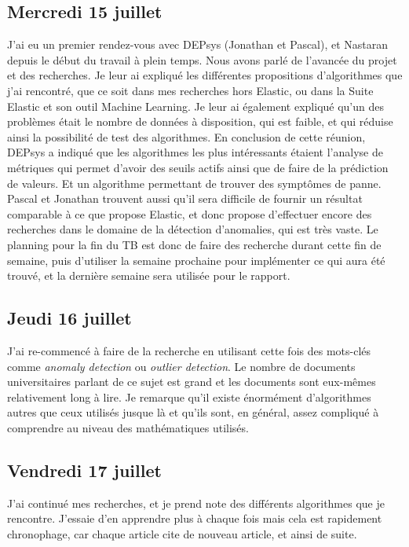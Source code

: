 \documentclass[paper=a4, fontsize=11pt]{scrartcl}
\begin{document}
\subsection{Mercredi 15 juillet}
    J'ai eu un premier rendez-vous avec DEPsys (Jonathan et Pascal), et Nastaran depuis le début du travail à plein temps. Nous avons parlé de l'avancée du projet et des recherches. Je leur ai expliqué les différentes propositions d'algorithmes que j'ai rencontré, que ce soit dans mes recherches hors Elastic, ou dans la Suite Elastic et son outil Machine Learning. Je leur ai également expliqué qu'un des problèmes était le nombre de données à disposition, qui est faible, et qui réduise ainsi la possibilité de test des algorithmes. En conclusion de cette réunion, DEPsys a indiqué que les algorithmes les plus intéressants étaient l'analyse de métriques qui permet d'avoir des seuils \og actifs \fg ainsi que de faire de la prédiction de valeurs. Et un algorithme permettant de trouver des symptômes de panne. Pascal et Jonathan trouvent aussi qu'il sera difficile de fournir un résultat comparable à ce que propose Elastic, et donc propose d'effectuer encore des recherches dans le domaine de la détection d'anomalies, qui est très vaste. Le planning pour la fin du TB est donc de faire des recherche durant cette fin de semaine, puis d'utiliser la semaine prochaine pour implémenter ce qui aura été trouvé, et la dernière semaine sera utilisée pour le rapport.
\subsection{Jeudi 16 juillet}
    J'ai re-commencé à faire de la recherche en utilisant cette fois des mots-clés comme \textit{anomaly detection} ou \textit{outlier detection}. Le nombre de documents universitaires parlant de ce sujet est grand et les documents sont eux-mêmes relativement long à lire. Je remarque qu'il existe énormément d'algorithmes autres que ceux utilisés jusque là et qu'ils sont, en général, assez compliqué à comprendre au niveau des mathématiques utilisés.
\subsection{Vendredi 17 juillet}
    J'ai continué mes recherches, et je prend note des différents algorithmes que je rencontre. J'essaie d'en apprendre plus à chaque fois mais cela est rapidement chronophage, car chaque article cite de nouveau article, et ainsi de suite.
\end{document}
